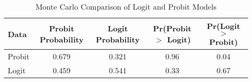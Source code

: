 \begin{table*}
\centering
\begin{tabular}{l|c|c|c|c}
  Data & Probit Probability & Logit Probability & Pr(Probit $>$ Logit) & Pr(Logit $>$ Probit) \\ 
   \hline
\hline
Probit & 0.679 & 0.321 & 0.96 & 0.04 \\ 
   \hline
Logit & 0.459 & 0.541 & 0.33 & 0.67 \\ 
   \hline
\end{tabular}
\caption{Monte Carlo Comparison of Logit and Probit Models} 
\label{tab:Probit-Logit-Sim}
\end{table*}

